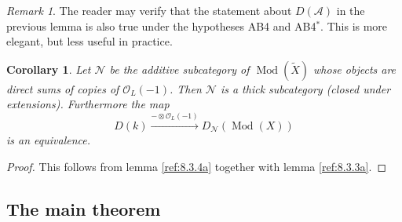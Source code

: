 \documentclass{amsproc}
\def\Ascr{{\mathcal A}}
\def\Nscr{{\mathcal N}}
\def\Oscr{{\mathcal O}}
\def\Qch{\operatorname {Mod}}
\newtheorem{corollarys}[lemmas]{Corollary}
\theoremstyle{definition}
\theoremstyle{remark}
\newtheorem{remarks}[lemmas]{Remark}
\numberwithin{equation}{section}
\numberwithin{table}{section}
\numberwithin{figure}{section}
\begin{document}
 \begin{remarks} The reader may verify that the statement about
 $D(\Ascr)$ in the previous lemma is also true under the hypotheses AB4
 and AB4${}^\ast$. This is more elegant, but less useful in practice.
 \end{remarks}
 \begin{corollarys}
\label{ref:8.3.6a}
 Let $\Nscr$ be the additive subcategory of
 $\Qch(\tilde{X})$ whose objects are direct sums of copies of
 $\Oscr_L(-1)$. Then $\Nscr$ is a thick subcategory (closed under
 extensions).  Furthermore  the map
 \[
 D(k)\xrightarrow{-\otimes \Oscr_L(-1)} D_\Nscr(\Qch(X))
 \]
 is an equivalence.
 \end{corollarys}
\begin{proof}
This follows from lemma \ref{ref:8.3.4a} together with lemma \ref{ref:8.3.3a}.
\end{proof}

\subsection{The main theorem}
\label{ref:8.4b}
\end{document}
